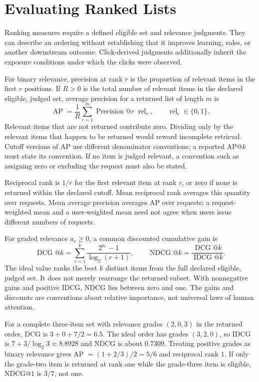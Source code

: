\section{Evaluating Ranked Lists}
\label{sec:ranking-eval}

Ranking measures require a defined eligible set and relevance judgments. They can describe an ordering without establishing that it improves learning, sales, or another downstream outcome. Click-derived judgments additionally inherit the exposure conditions under which the clicks were observed.

For binary relevance, precision at rank $r$ is the proportion of relevant items in the first $r$ positions. If $R>0$ is the total number of relevant items in the declared eligible, judged set, average precision for a returned list of length $m$ is \citep{manning2008}
\[
\operatorname{AP}=\frac{1}{R}\sum_{r=1}^m
\operatorname{Precision}@r\;\operatorname{rel}_r,
\qquad \operatorname{rel}_r\in\{0,1\}.
\]
Relevant items that are not returned contribute zero. Dividing only by the relevant items that happen to be returned would reward incomplete retrieval. Cutoff versions of AP use different denominator conventions; a reported AP@$k$ must state its convention. If no item is judged relevant, a convention such as assigning zero or excluding the request must also be stated.

Reciprocal rank is $1/r$ for the first relevant item at rank $r$, or zero if none is returned within the declared cutoff. Mean reciprocal rank averages this quantity over requests. Mean average precision averages AP over requests; a request-weighted mean and a user-weighted mean need not agree when users issue different numbers of requests.

For graded relevance $a_r\ge0$, a common discounted cumulative gain is
\[
\operatorname{DCG}@k=\sum_{r=1}^k\frac{2^{a_r}-1}{\log_2(r+1)},
\qquad
\operatorname{NDCG}@k=\frac{\operatorname{DCG}@k}{\operatorname{IDCG}@k}.
\]
The ideal value ranks the best $k$ distinct items from the full declared eligible, judged set. It does not merely rearrange the returned subset. With nonnegative gains and positive IDCG, NDCG lies between zero and one. The gains and discounts are conventions about relative importance, not universal laws of human attention.

For a complete three-item set with relevance grades $(2,0,3)$ in the returned order, DCG is $3+0+7/2=6.5$. The ideal order has grades $(3,2,0)$, so IDCG is $7+3/\log_2 3\approx8.8928$ and NDCG is about $0.7309$. Treating positive grades as binary relevance gives AP $=(1+2/3)/2=5/6$ and reciprocal rank $1$. If only the grade-two item is returned at rank one while the grade-three item is eligible, NDCG@$1$ is $3/7$, not one.

